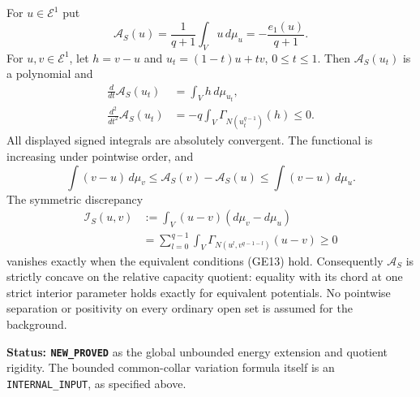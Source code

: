 \begin{theorem}
\label{thm:r11-global-Aubin-Mabuchi}
For $u\in\mathcal E^1$ put
\[
             \mathscr A_S(u)=\frac1{q+1}\int_V u\,d\mu_u
                              =-\frac{e_1(u)}{q+1}.
 \tag{GE15}
\]
For $u,v\in\mathcal E^1$, let $h=v-u$ and
$u_t=(1-t)u+tv$, $0\leq t\leq1$. Then $\mathscr A_S(u_t)$
is a polynomial and
\[
 \begin{split}
 \frac d{dt}\mathscr A_S(u_t)&=\int_V h\,d\mu_{u_t},\\
 \frac {d^2}{dt^2}\mathscr A_S(u_t)
              &=-q\int_V\Gamma_{N(u_t^{q-1})}(h)\leq0.
 \end{split}
 \tag{GE16}
\]
All displayed signed integrals are absolutely convergent.
The functional is increasing under pointwise order, and
\[
 \int(v-u)\,d\mu_v
    \leq\mathscr A_S(v)-\mathscr A_S(u)
    \leq\int(v-u)\,d\mu_u.
 \tag{GE17}
\]
The symmetric discrepancy
\[
 \begin{split}
 \mathscr I_S(u,v)
    &:=\int_V(u-v)(d\mu_v-d\mu_u)\\
    &=\sum_{l=0}^{q-1}
       \int_V\Gamma_{N(u^l,v^{q-1-l})}(u-v)\geq0
 \end{split}
 \tag{GE18}
\]
vanishes exactly when the equivalent conditions (GE13) hold.
Consequently $\mathscr A_S$ is strictly concave on the
relative capacity quotient: equality with its chord at one
strict interior parameter holds exactly for equivalent
potentials. No pointwise separation or positivity on every
ordinary open set is assumed for the background.
\end{theorem}

\noindent\textbf{Status: \texttt{NEW\_PROVED}} as the
global unbounded energy extension and quotient rigidity.
The bounded common-collar variation formula itself is an
\texttt{INTERNAL\_INPUT}, as specified above.

